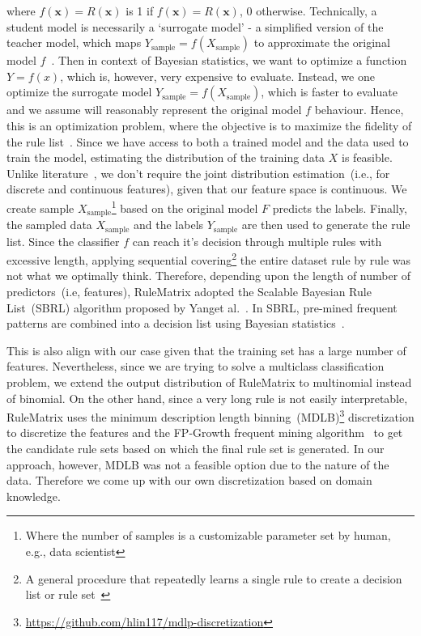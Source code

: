 \hspace*{3.5mm} where $f(\boldsymbol{x})=R(\boldsymbol{x})$ is 1 if $f(\boldsymbol{x})=R(\boldsymbol{x})$, 0 otherwise. Technically, a student model is necessarily a `surrogate model' - a simplified version of the teacher model, which maps $Y_\text{sample}=f(X_\text{sample})$ to approximate the original model $f$~\cite{forrester2008engineering}. Then in context of Bayesian statistics, we want to optimize a function $Y=f(x)$, which is, however, very expensive to evaluate. Instead, we one optimize the surrogate model $Y_\text{sample}=f(X_\text{sample})$, which is faster to evaluate and we assume will reasonably represent the original model $f$ behaviour. Hence, this is an optimization problem, where the objective is to maximize the fidelity of the rule list~\cite{ming2018rulematrix}. Since we have access to both a trained model and the data used to train the model, estimating the distribution of the training data ${X}$ is feasible. 
\hspace*{3.5mm} Unlike literature~\cite{ming2018rulematrix}, we don't require the joint distribution estimation~(i.e., for discrete and continuous features), given that our feature space is continuous. We create sample ${X}_{\text {sample}}$\footnote{Where the number of samples is a customizable parameter set by human, e.g., data scientist} based on the original model $F$ predicts the labels. Finally, the sampled data ${X}_{\text {sample}}$ and the labels ${Y}_{\text {sample}}$ are then used to generate the rule list.
Since the classifier $f$ can reach it's decision through multiple rules with excessive length, applying sequential covering\footnote{A general procedure that repeatedly learns a single rule to create a decision list or rule set~\cite{molnar2019interpretable}} the entire dataset rule by rule was not what we optimally think. Therefore, depending upon the length of number of predictors~(i.e, features), RuleMatrix adopted the Scalable Bayesian Rule List~(SBRL) algorithm proposed by Yanget al.~\cite{BayesianRule}. In SBRL, pre-mined frequent patterns are combined into a decision list using Bayesian statistics~\cite{molnar2019interpretable}. 

\hspace*{3.5mm} This is also align with our case given that the training set has a large number of features. Nevertheless, since we are trying to solve a multiclass classification problem, we extend the output distribution of RuleMatrix to multinomial instead of binomial. On the other hand, since a very long rule is not easily interpretable, RuleMatrix uses the minimum description length binning~(MDLB)\footnote{\url{https://github.com/hlin117/mdlp-discretization}} discretization to discretize the features and the FP-Growth frequent mining algorithm~\cite{han2000mining} to get the candidate rule sets based on which the final rule set is generated. In our approach, however, MDLB was not a feasible option due to the nature of the data. Therefore we come up with our own discretization based on domain knowledge.

